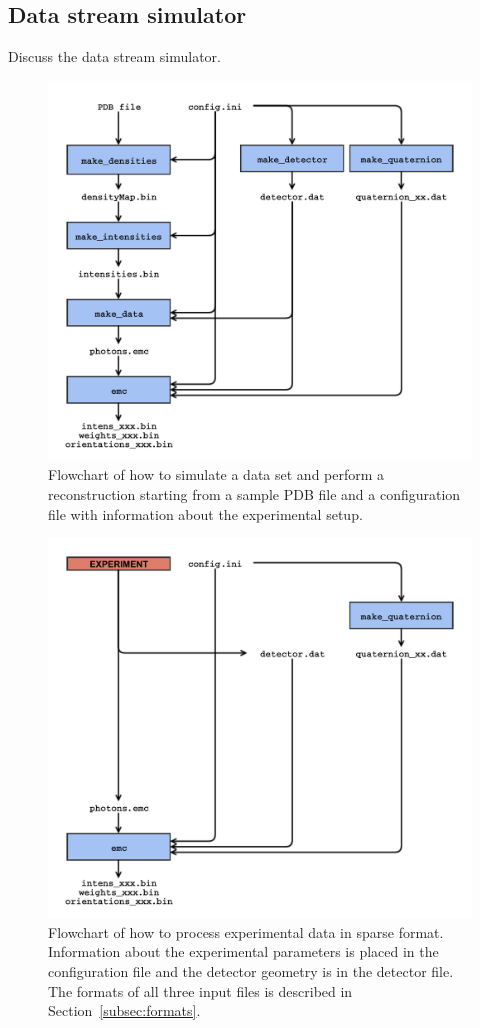 \documentclass[]{iucr}              %
\begin{document}
\subsection{Data stream simulator}
Discuss the data stream simulator. 
\begin{figure}
\caption{Flowchart of how to simulate a data set and perform a reconstruction starting from a sample PDB file and a configuration file with information about the experimental setup.}
\includegraphics[width=\textwidth]{figures/emc_sim.pdf}
\end{figure}

\begin{figure}
\caption{Flowchart of how to process experimental data in sparse format. Information about the experimental parameters is placed in the configuration file and the detector geometry is in the detector file. The formats of all three input files is described in Section~\ref{subsec:formats}.}
\includegraphics[width=\textwidth]{figures/emc_exp.pdf}
\end{figure}
\end{document}
